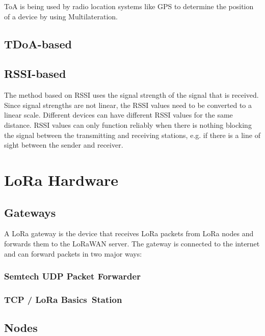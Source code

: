 \ac{ToA} is being used by radio location systems like \ac{GPS} to determine the position of a device by using Multilateration.

\subsection{\acs{TDoA}-based}



\subsection{\acs{RSSI}-based}

The method based on \acf{RSSI} uses the signal strength of the signal that is received.
Since signal strengths are not linear, the \ac{RSSI} values need to be converted to a linear scale.
Different devices can have different \ac{RSSI} values for the same distance.
\ac{RSSI} values can only function reliably when there is nothing blocking the signal between the transmitting and receiving stations, e.g. if there is a line of sight between the sender and receiver.

\section{\ac{LoRa} Hardware}

\subsection{Gateways}

A \ac{LoRa} gateway is the device that receives \ac{LoRa} packets from \ac{LoRa} nodes and forwards them to the \ac{LoRaWAN} server.
The gateway is connected to the internet and can forward packets in two major ways:

\subsubsection{Semtech \acs{UDP} Packet Forwarder}


\subsubsection{\acf{TCP} / LoRa Basics\texttrademark~Station}


\subsection{Nodes}